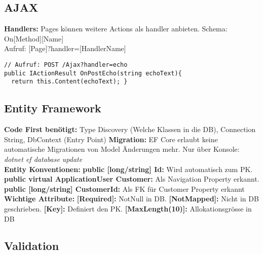 \subsection{AJAX}
\textcolor{b}{\textbf{Handlers:}} Pages können weitere Actions als handler anbieten. Schema: \textcolor{b}{On[Method][Name]}\\
Aufruf: \textcolor{b}{[Page]?handler=[HandlerName]}
\begin{lstlisting}[style=csh]
// Aufruf: POST /Ajax?handler=echo
public IActionResult OnPostEcho(string echoText){
  return this.Content(echoText); }
\end{lstlisting}
\subsection{Entity Framework}
\textcolor{b}{\textbf{Code First benötigt:}} Type Discovery (Welche Klassen in die DB), Connection String, DbContext (Entry Point) \textcolor{b}{\textbf{Migration:}} EF Core erlaubt keine automatische Migrationen von Model Änderungen mehr. Nur über Konsole: \textit{dotnet ef database update}\\
\textcolor{b}{\textbf{Entity Konventionen:}} \textbf{public [long/string] Id:} Wird automatisch zum PK. \textbf{public virtual ApplicationUser Customer:} Als Navigation Property erkannt. \textbf{public [long/string] CustomerId:} Als FK für Customer Property erkannt\\
\textcolor{b}{\textbf{Wichtige Attribute:}} \textbf{[Required]:} NotNull in DB. \textbf{[NotMapped]:} Nicht in DB geschrieben. \textbf{[Key]:} Definiert den PK. \textbf{[MaxLength(10)]:} Allokationsgrösse in DB
\subsection{Validation}